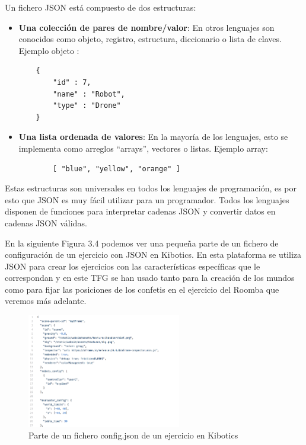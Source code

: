 Un fichero JSON está compuesto de dos estructuras: 
\begin{itemize}
    \item \textbf{Una colección de pares de nombre/valor}: En otros lenguajes son conocidos como objeto, registro, estructura, diccionario o lista de claves. 
    Ejemplo objeto : 
    \begin{lstlisting}
    {
        "id" : 7,
        "name" : "Robot",
        "type" : "Drone"
    }
     \end{lstlisting}
    \item \textbf{Una lista ordenada de valores}: En la mayoría de los lenguajes, esto se implementa como arreglos ``arrays'', vectores o listas.  
     Ejemplo array:  
     \begin{lstlisting}
        [ "blue", "yellow", "orange" ]
     \end{lstlisting}
\end{itemize}

Estas estructuras son universales en todos los lenguajes de programación, es por esto que  JSON es muy fácil utilizar para un programador. Todos los lenguajes disponen de funciones para interpretar cadenas JSON y convertir datos en cadenas JSON válidas.

En la siguiente Figura 3.4 podemos ver una pequeña parte de un fichero de configuración de un ejercicio con JSON en Kibotics. En esta plataforma se utiliza JSON para crear los ejercicios con las características específicas que le correspondan y en este TFG se han usado tanto para la creación de los mundos como para fijar las posiciones de los confetis en el ejercicio del Roomba que veremos más adelante.

\begin{figure}[H]
    \centering
    \includegraphics[width=0.6\textwidth, height=0.4\textwidth]{chapters/images/json.png}
    \caption{Parte de un fichero config.json de un ejercicio en Kibotics}
    \label{fig:my_label}
\end{figure}

